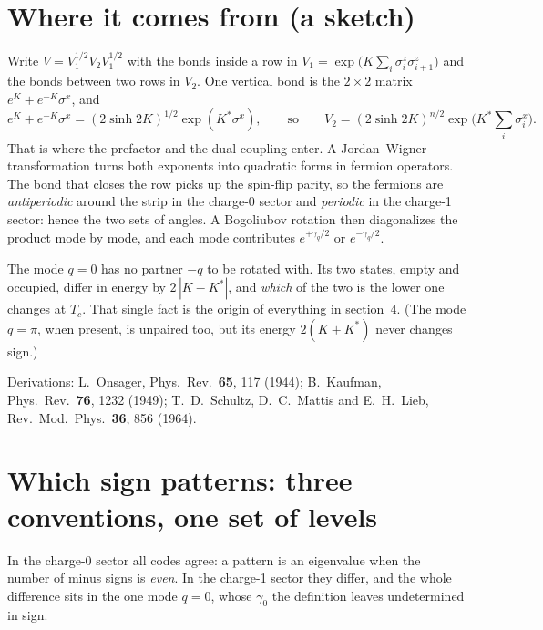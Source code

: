 \documentclass[11pt]{article}
\begin{document}
\section{Where it comes from (a sketch)}

Write $V = V_1^{1/2} V_2 V_1^{1/2}$ with the bonds inside a row in
$V_1 = \exp\big(K \sum_i \sigma^z_i \sigma^z_{i+1}\big)$ and the bonds between two rows in $V_2$.
One vertical bond is the $2 \times 2$ matrix $e^{K} + e^{-K} \sigma^x$, and
\begin{equation}
e^{K} + e^{-K} \sigma^x = (2 \sinh 2K)^{1/2} \exp( K^* \sigma^x ),
\qquad\text{so}\qquad
V_2 = (2 \sinh 2K)^{n/2} \exp\Big( K^* \sum_i \sigma^x_i \Big) .
\end{equation}
That is where the prefactor and the dual coupling enter.  A Jordan--Wigner transformation turns
both exponents into quadratic forms in fermion operators.  The bond that closes the row picks up
the spin-flip parity, so the fermions are \emph{antiperiodic} around the strip in the charge-0
sector and \emph{periodic} in the charge-1 sector: hence the two sets of angles.  A Bogoliubov
rotation then diagonalizes the product mode by mode, and each mode contributes $e^{+\gamma_q/2}$
or $e^{-\gamma_q/2}$.

The mode $q = 0$ has no partner $-q$ to be rotated with.  Its two states, empty and occupied,
differ in energy by $2\,|K - K^*|$, and \emph{which} of the two is the lower one changes at
$T_c$.  That single fact is the origin of everything in section~4.  (The mode $q = \pi$, when
present, is unpaired too, but its energy $2(K + K^*)$ never changes sign.)

Derivations: L.~Onsager, Phys.\ Rev.\ \textbf{65}, 117 (1944); B.~Kaufman, Phys.\ Rev.\
\textbf{76}, 1232 (1949); T.~D.~Schultz, D.~C.~Mattis and E.~H.~Lieb, Rev.\ Mod.\ Phys.\
\textbf{36}, 856 (1964).

\section{Which sign patterns: three conventions, one set of levels}

In the charge-0 sector all codes agree: a pattern is an eigenvalue when the number of minus signs
is \emph{even}.  In the charge-1 sector they differ, and the whole difference sits in the one
mode $q = 0$, whose $\gamma_0$ the definition leaves undetermined in sign.
\end{document}
